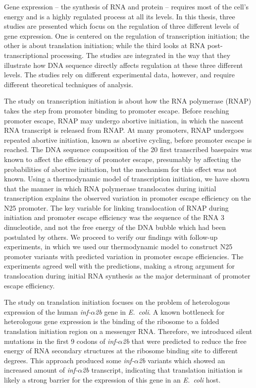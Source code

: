 Gene expression -- the synthesis of RNA and protein -- requires most of the
cell's energy and is a highly regulated process at all its levels. In this
thesis, three studies are presented which focus on the regulation of three
different levels of gene expression. One is centered on the regulation of
transcription initiation; the other is about translation initiation; while the
third looks at RNA post-transcriptional processing. The studies are integrated
in the way that they illustrate how DNA sequence directly affects regulation at
these three different levels. The studies rely on different experimental data,
however, and require different theoretical techniques of analysis.

The study on transcription initiation is about how the RNA polymerase (RNAP)
takes the step from promoter binding to promoter escape. Before reaching
promoter escape, RNAP may undergo abortive initiation, in which the nascent RNA
transcript is released from RNAP. At many promoters, RNAP undergoes repeated
abortive initiation, known as abortive cycling, before promoter escape is
reached. The DNA sequence composition of the 20 first transcribed basepairs was
known to affect the efficiency of promoter escape, presumably by affecting the
probabilities of abortive initiation, but the mechanism for this effect was not
known. Using a thermodynamic model of transcription initiation, we have shown
that the manner in which RNA polymerase translocates during initial
transcription explains the observed variation in promoter escape efficiency on
the N25 promoter. The key variable for linking translocation of RNAP during
initiation and promoter escape efficiency was the sequence of the RNA 3\ppp
dinucleotide, and not the free energy of the DNA bubble which had been
postulated by others. We proceed to verify our findings with follow-up
experiments, in which we used our thermodynamic model to construct N25 promoter
variants with predicted variation in promoter escape efficiencies. The
experiments agreed well with the predictions, making a strong argument for
translocation during initial RNA synthesis as the major determinant of promoter
escape efficiency.

The study on translation initiation focuses on the problem of heterologous
expression of the human \textit{inf-$\alpha$2b} gene in \textit{E.\ coli}. A
known bottleneck for heterologous gene expression is the binding of the
ribosome to a folded translation initiation region on a messenger RNA.
Therefore, we introduced silent mutations in the first 9 codons of
\textit{inf-$\alpha$2b} that were predicted to reduce the free energy of RNA
secondary structures at the ribosome binding site to different degrees. This
approach produced some \textit{inf-$\alpha$2b} variants which showed an 
increased amount of \textit{inf-$\alpha$2b} transcript, indicating that
translation initiation is likely a strong barrier for the expression of this
gene in an \textit{E.\ coli} host.

